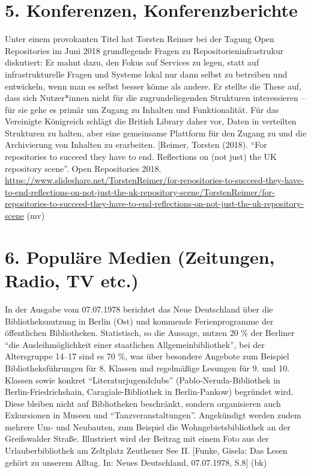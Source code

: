\documentclass[a4paper,
fontsize=11pt,
oneside,
numbers=noperiodatend,
parskip=half-,
bibliography=totoc,
final
]{scrartcl}
\begin{document}
\hypertarget{konferenzen-konferenzberichte}{%
\section{5. Konferenzen,
Konferenzberichte}\label{konferenzen-konferenzberichte}}

Unter einem provokanten Titel hat Torsten Reimer bei der Tagung Open
Repositories im Juni 2018 grundlegende Fragen zu
Repositorieninfrastrukur diskutiert: Er mahnt dazu, den Fokus auf
Services zu legen, statt auf infrastrukturelle Fragen und Systeme lokal
nur dann selbst zu betreiben und entwickeln, wenn man es selbst besser
könne als andere. Er stellte die These auf, dass sich Nutzer*innen nicht
für die zugrundeliegenden Strukturen interessieren -- für sie gehe es
primär um Zugang zu Inhalten und Funktionalität. Für das Vereinigte
Königreich schlägt die British Library daher vor, Daten in verteilten
Strukturen zu halten, aber eine gemeinsame Plattform für den Zugang zu
und die Archivierung von Inhalten zu erarbeiten. {[}Reimer, Torsten
(2018). \enquote{For repositories to succeed they have to end.
Reflections on (not just) the UK repository scene}. Open Repositories
2018.
\url{https://www.slideshare.net/TorstenReimer/for-repositories-to-succeed-they-have-to-end-reflections-on-not-just-the-uk-repository-scene/TorstenReimer/for-repositories-to-succeed-they-have-to-end-reflections-on-not-just-the-uk-repository-scene}
(mv)

\hypertarget{populuxe4re-medien-zeitungen-radio-tv-etc.}{%
\section{6. Populäre Medien (Zeitungen, Radio, TV
etc.)}\label{populuxe4re-medien-zeitungen-radio-tv-etc.}}

In der Ausgabe vom 07.07.1978 berichtet das Neue Deutschland über die
Bibliotheksnutzung in Berlin (Ost) und kommende Ferienprogramme der
öffentlichen Bibliotheken. Statistisch, so die Aussage, nutzen 20 \% der
Berliner \enquote{die Ausleihmöglichkeit einer staatlichen
Allgemeinbibliothek}, bei der Altersgruppe 14--17 sind es 70 \%, was
über besondere Angebote zum Beispiel Bibliotheksführungen für 8. Klassen
und regelmäßige Lesungen für 9. und 10. Klassen sowie konkret
\enquote{Literaturjugendclubs} (Pablo-Neruda-Bibliothek in
Berlin-Friedrichshain, Caragiale-Bibliothek in Berlin-Pankow) begründet
wird. Diese bleiben nicht auf Bibliotheken beschränkt, sondern
organisieren auch Exkursionen in Museen und
\enquote{Tanzveranstaltungen}. Angekündigt werden zudem mehrere Um- und
Neubauten, zum Beispiel die Wohngebietsbibliothek an der Greifswalder
Straße. Illustriert wird der Beitrag mit einem Foto aus der
Urlauberbibliothek am Zeltplatz Zeuthener See II. {[}Funke, Gisela: Das
Lesen gehört zu unserem Alltag. In: Neues Deutschland, 07.07.1978,
S.8{]} (bk)
\end{document}
